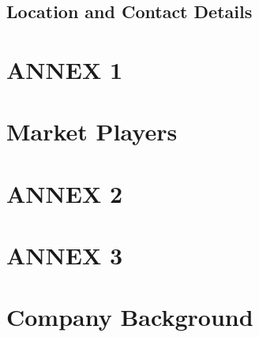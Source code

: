 \documentclass[11pt]{article}
\begin{document}
  \subsection{Location and Contact Details}
\section{ANNEX 1}
\section{Market Players}
\section{ANNEX 2}
\section{ANNEX 3}
\section{Company Background}
\end{document}
